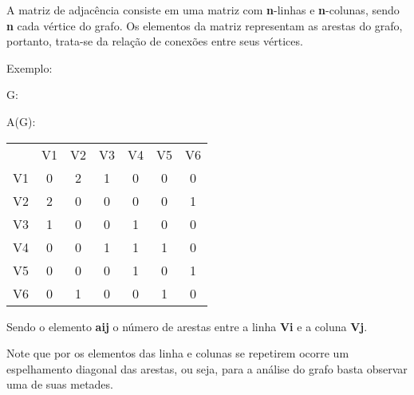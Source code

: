 \documentclass[a4paper, 12pt]{article}
\begin{document}
    A matriz de adjacência consiste em uma matriz com \textbf{n}-linhas e \textbf{n}-colunas, sendo \textbf{n} cada vértice do grafo. Os elementos da matriz representam as arestas do grafo, portanto, trata-se da relação de conexões entre seus vértices.
    
    \vspace{0.5in}
    
    Exemplo:
    
    \begin{multicols}{2}
        \begin{center}
        G:
        \end{center}
        
        \begin{center}
        A(G):
        \end{center}
        \begin{tabular}{ccccccc}
                & V1 & V2 & V3 & V4 & V5 & V6 \\
                V1 & 0  & 2  & 1  & 0  & 0  & 0  \\
                V2 & 2  & 0  & 0  & 0  & 0  & 1  \\
                V3 & 1  & 0  & 0  & 1  & 0  & 0  \\
                V4 & 0  & 0  & 1  & 1  & 1  & 0  \\
                V5 & 0  & 0  & 0  & 1  & 0  & 1  \\
                V6 & 0  & 1  & 0  & 0  & 1  & 0 
        \end{tabular}
    \end{multicols}
    
    \vspace{0.5in}
    
    Sendo o elemento \textbf{aij} o número de arestas entre a linha \textbf{Vi} e a coluna \textbf{Vj}. 
    
    \indent Note que por os elementos das linha e colunas se repetirem ocorre um espelhamento diagonal das arestas, ou seja, para a análise do grafo basta observar uma de suas metades. 
\end{document}
